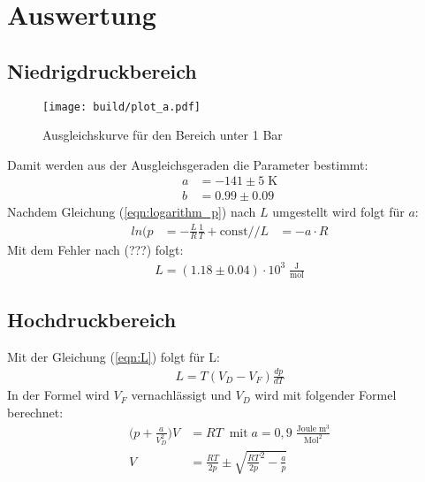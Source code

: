 \newpage
\section{Auswertung}
\label{sec:Auswertung}
\subsection{Niedrigdruckbereich}
\begin{figure}
    \centering
    \texttt{[image: build/plot\_a.pdf]}
    \caption{Ausgleichskurve für den Bereich unter 1 Bar}
    \label{fig:Niedrigdruck}
\end{figure}
Damit werden aus der Ausgleichsgeraden die Parameter bestimmt:
\begin{align}
    a &= -141\pm 5 \; \text{K}\\
    b &= 0.99\pm 0.09
\end{align}
Nachdem Gleichung (\ref{eqn:logarithm_p}) nach $L$ umgestellt wird folgt für $a$:
\begin{align}
    ln(p &= -\frac{L}{R}\frac{1}{T}+\text{const} // L &= -a\cdot R
\end{align}
Mit dem Fehler nach (???) folgt:
\begin{align}
    L = (1.18 \pm 0.04)\cdot 10^3 \; \frac{\text{J}}{\text{mol}}
\end{align}
\subsection{Hochdruckbereich}
Mit der Gleichung (\ref{eqn:L}) folgt für L:
\begin{align}
    L = T(V_D - V_F) \frac{dp}{dT}
\end{align}
In der Formel wird $V_F$ vernachlässigt und $V_D$ wird mit folgender Formel berechnet:
\begin{align}
    \biggl( p+\frac{a}{V_D^2} \biggr) V &= RT\;\; \text{mit} \; a = 0,9 \; \frac{\text{Joule}\;{\text{m}}^3}{{\text{Mol}^2}}\\
    V &= \frac{RT}{2p} \pm \sqrt{{\frac{RT}{2p}}^2-\frac{a}{p}}
\end{align}